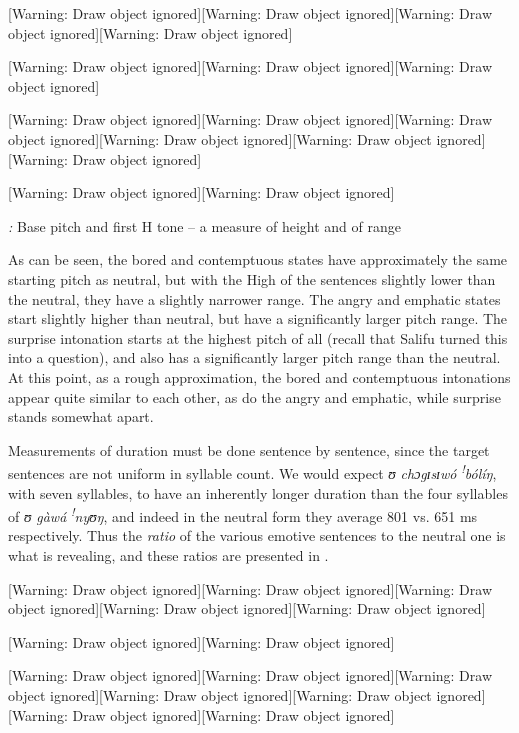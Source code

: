 \documentclass[output=paper]{langsci/langscibook}
\begin{document}
[Warning: Draw object ignored][Warning: Draw object ignored][Warning: Draw object ignored][Warning: Draw object ignored]

[Warning: Draw object ignored][Warning: Draw object ignored][Warning: Draw object ignored]

[Warning: Draw object ignored][Warning: Draw object ignored][Warning: Draw object ignored][Warning: Draw object ignored][Warning: Draw object ignored][Warning: Draw object ignored]

[Warning: Draw object ignored][Warning: Draw object ignored]

\emph{\textup{:}}\textit{ }Base pitch and first H tone – a measure of height and of range

As can be seen, the bored and contemptuous states have approximately the same starting pitch as neutral, but with the High of the sentences slightly lower than the neutral, they have a slightly narrower range.  The angry and emphatic states start slightly higher than neutral, but have a significantly larger pitch range.  The surprise intonation starts at the highest pitch of all (recall that Salifu turned this into a question), and also has a significantly larger pitch range than the neutral. At this point, as a rough approximation, the bored and contemptuous intonations appear quite similar to each other, as do the angry and emphatic, while surprise stands somewhat apart. 

Measurements of duration must be done sentence by sentence, since the target sentences are not uniform in syllable count. We would expect\textit{ ʊ chɔgɪsɪwó }\textit{\textsuperscript{!}}\textit{bólíŋ}, with seven syllables,\textit{ }to have an inherently longer duration than the four syllables of \textit{ʊ gàwá }\textit{\textsuperscript{!}}\textit{nyʊŋ}, and indeed in the neutral form they average 801 vs. 651 ms respectively. Thus the \emph{ratio} of the various emotive sentences to the neutral one is what is revealing, and these ratios are presented in . 

[Warning: Draw object ignored][Warning: Draw object ignored][Warning: Draw object ignored][Warning: Draw object ignored][Warning: Draw object ignored]

[Warning: Draw object ignored][Warning: Draw object ignored]

[Warning: Draw object ignored][Warning: Draw object ignored][Warning: Draw object ignored][Warning: Draw object ignored][Warning: Draw object ignored][Warning: Draw object ignored][Warning: Draw object ignored]
\end{document}
